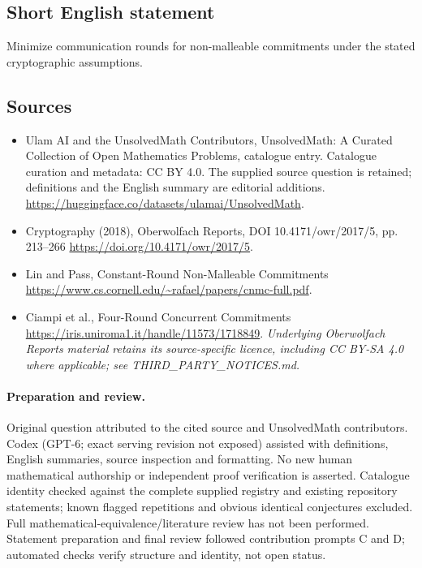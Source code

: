 \documentclass[11pt]{article}
\begin{document}
\subsection{Short English statement}
Minimize communication rounds for non-malleable commitments under the stated cryptographic assumptions.
\subsection{Sources}
\begin{itemize}
\item[\hypertarget{source:statement:1}{S1}] Ulam AI and the UnsolvedMath Contributors, UnsolvedMath: A Curated Collection of Open Mathematics Problems, catalogue entry. Catalogue curation and metadata: CC BY 4.0. The supplied source question is retained; definitions and the English summary are editorial additions.
\url{https://huggingface.co/datasets/ulamai/UnsolvedMath}.
\item[\hypertarget{source:statement:2}{S2}] Cryptography (2018), Oberwolfach Reports, DOI 10.4171/owr/2017/5, pp. 213--266
\url{https://doi.org/10.4171/owr/2017/5}.
\item[\hypertarget{source:statement:3}{S3}] Lin and Pass, Constant-Round Non-Malleable Commitments
\url{https://www.cs.cornell.edu/~rafael/papers/cnmc-full.pdf}.
\item[\hypertarget{source:statement:4}{S4}] Ciampi et al., Four-Round Concurrent Commitments
\url{https://iris.uniroma1.it/handle/11573/1718849}.
\textit{Underlying Oberwolfach Reports material retains its source-specific licence, including CC BY-SA 4.0 where applicable; see THIRD\_PARTY\_NOTICES.md.}
\end{itemize}
\paragraph{Preparation and review.}
Original question attributed to the cited source and UnsolvedMath contributors. Codex (GPT-6; exact serving revision not exposed) assisted with definitions, English summaries, source inspection and formatting. No new human mathematical authorship or independent proof verification is asserted. Catalogue identity checked against the complete supplied registry and existing repository statements; known flagged repetitions and obvious identical conjectures excluded. Full mathematical-equivalence/literature review has not been performed. Statement preparation and final review followed contribution prompts C and D; automated checks verify structure and identity, not open status.
\label{end:statement}
\end{document}
